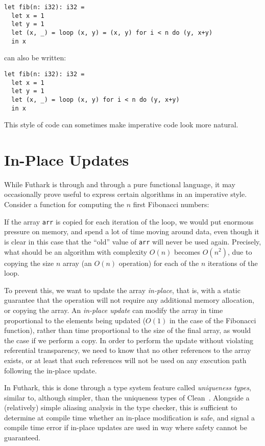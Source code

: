 \documentclass[oneside,11pt]{book}
\newenvironment{wrap}{\vspace{\topskip}\par\noindent\begin{minipage}{\linewidth}}{\end{minipage}\par}
\newcommand{\inplisting}[1]{\begin{wrap}\end{wrap}}
\begin{document}
\begin{lstlisting}
let fib(n: i32): i32 =
  let x = 1
  let y = 1
  let (x, _) = loop (x, y) = (x, y) for i < n do (y, x+y)
  in x
\end{lstlisting}

\noindent
can also be written:

\begin{lstlisting}
let fib(n: i32): i32 =
  let x = 1
  let y = 1
  let (x, _) = loop (x, y) for i < n do (y, x+y)
  in x
\end{lstlisting}

\noindent
This style of code can sometimes make imperative code look more natural.

\section{In-Place Updates}
\label{sec:in-place-updates}

While Futhark is through and through a pure functional language, it
may occasionally prove useful to express certain algorithms in an
imperative style.  Consider a function for computing the $n$ first
Fibonacci numbers:

\inplisting{src/fib_sequential.fut}

If the array \texttt{arr} is copied for each iteration of the loop, we
would put enormous pressure on memory, and spend a lot of time moving
around data, even though it is clear in this case that the ``old''
value of \texttt{arr} will never be used again.  Precisely, what
should be an algorithm with complexity $O(n)$ becomes $O(n^2)$, due to
copying the size $n$ array (an $O(n)$ operation) for each of the $n$
iterations of the loop.

To prevent this, we want to update the array \textit{in-place}, that
is, with a static guarantee that the operation will not require any
additional memory allocation, or copying the array.  An
\textit{in-place update} can modify the array in time proportional to
the elements being updated ($O(1)$ in the case of the Fibonacci
function), rather than time proportional to the size of the final
array, as would the case if we perform a copy.  In order to perform
the update without violating referential transparency, we need to know
that no other references to the array exists, or at least that such
references will not be used on any execution path following the
in-place update.

In Futhark, this is done through a type system feature called
\textit{uniqueness types}, similar to, although simpler, than the
uniqueness types of
Clean~\cite{clean-uniqueness-types,barendsen1996uniqueness}.
Alongside a (relatively) simple aliasing analysis in the type checker,
this is sufficient to determine at compile time whether an in-place
modification is safe, and signal a compile time error if in-place
updates are used in way where safety cannot be guaranteed.
\end{document}

